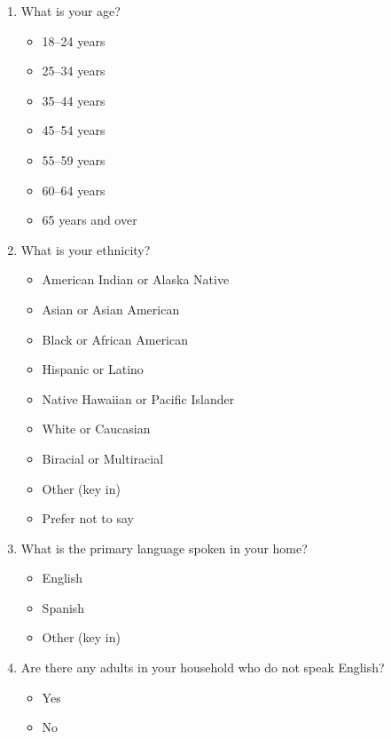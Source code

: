 \documentclass{article}
\begin{document}
\begin{enumerate}
\item What is your age?
\begin{itemize}
  \item[\checkbox] 18--24 years
  \item[\checkbox] 25--34 years
  \item[\checkbox] 35--44 years
  \item[\checkbox] 45--54 years
  \item[\checkbox] 55--59 years
  \item[\checkbox] 60--64 years
  \item[\checkbox] 65 years and over
\end{itemize}
 

\item What is your ethnicity?
\begin{itemize}
  \item[\checkbox] American Indian or Alaska Native
  \item[\checkbox] Asian or Asian American
  \item[\checkbox] Black or African American
  \item[\checkbox] Hispanic or Latino
  \item[\checkbox] Native Hawaiian or Pacific Islander
  \item[\checkbox] White or Caucasian
  \item[\checkbox] Biracial or Multiracial
  \item[\checkbox] Other (key in)
  \item[\checkbox] Prefer not to say
\end{itemize}
 

\item What is the primary language spoken in your home?
\begin{itemize}
  \item[\checkbox] English
  \item[\checkbox] Spanish
  \item[\checkbox] Other (key in)
\end{itemize}
 

\item Are there any adults in your household who do not speak English?
\begin{itemize}
  \item[\checkbox] Yes
  \item[\checkbox] No
\end{itemize}
 


\end{enumerate}
\end{document}
